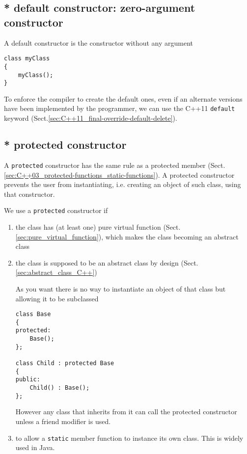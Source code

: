 \subsection{* default constructor: zero-argument constructor}
\label{sec:default-constructor}

A default constructor is the constructor without any argument
\begin{verbatim}
class myClass
{
	myClass();
}
\end{verbatim}

To enforce the compiler to create the default ones, even if an alternate
versions have been implemented by the programmer, we can use the C++11
\verb!default! keyword (Sect.\ref{sec:C++11_final-override-default-delete}).


\subsection{* protected constructor}
\label{sec:protected_constructor}

A \verb!protected! constructor has the same rule as a protected member
(Sect.\ref{sec:C++03_protected-functions_static-functions}).
A protected constructor prevents the user from instantiating, i.e. creating an
object of such class, using that constructor.


We use a \verb!protected! constructor if
\begin{enumerate}
  \item  the class has (at least one) pure virtual function (Sect.\ref{sec:pure_virtual_function}), which makes the class
  becoming an abstract class
  
  \item the class is supposed to be an abstract class by design (Sect.\ref{sec:abstract_class_C++})
  
  As you want there is no way to instantiate an object of that class but allowing it to be
  subclassed
\begin{Verbatim}
class Base
{
protected:
    Base();
};

class Child : protected Base
{
public:
    Child() : Base();
};
\end{Verbatim}

However any class that inherits from it can call the protected constructor
unless a friend modifier is used.


  \item to allow a \verb!static! member function to instance its own class. This
  is widely used in Java.
\end{enumerate}
  
